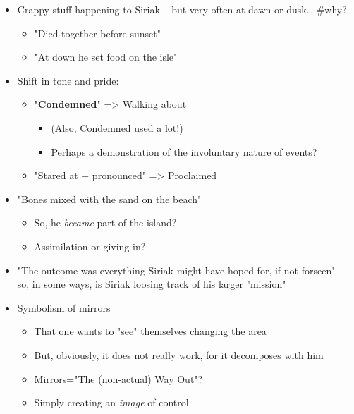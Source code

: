 \documentclass[letterpaper]{article}
\begin{document}
\begin{itemize}
\item Crappy stuff happening to Siriak -- but very often at dawn or dusk\ldots{}
\#why?

\begin{itemize}
\item "Died together before sunset"
\item "At down he set food on the isle"
\end{itemize}

\item Shift in tone and pride:

\begin{itemize}
\item "\textbf{Condemned}" => Walking about

\begin{itemize}
\item (Also, Condemned used a lot!)
\item Perhaps a demonstration of the involuntary nature of events?
\end{itemize}

\item "Stared at + pronounced" => Proclaimed
\end{itemize}

\item "Bones mixed with the sand on the beach"

\begin{itemize}
\item So, he \emph{became} part of the island?
\item Assimilation or giving in?
\end{itemize}

\item "The outcome was everything Siriak might have hoped for, if not
forseen" --- so, in some ways, is Siriak loosing track of his larger
"mission"
\item Symbolism of mirrors

\begin{itemize}
\item That one wants to "see" themselves changing the area
\item But, obviously, it does not really work, for it decomposes with him
\item Mirrors="The (non-actual) Way Out"?
\item Simply creating an \emph{image} of control
\end{itemize}
\end{itemize}
\end{document}
